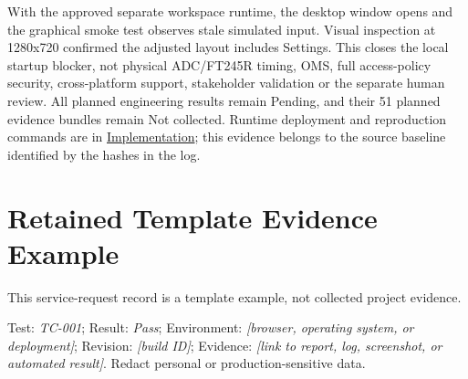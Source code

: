 With the approved separate workspace runtime, the desktop window opens and
the graphical smoke test observes stale simulated input. Visual inspection at
1280x720 confirmed the adjusted layout includes Settings. This closes the
local startup blocker, not physical ADC/FT245R timing, OMS, full access-policy
security, cross-platform support, stakeholder validation or the separate human
review. All planned engineering results remain Pending, and their 51 planned
evidence bundles remain Not collected. Runtime deployment and reproduction
commands are in \hyperref[Section:SimulatorPrototype]{Implementation}; this
evidence belongs to the source baseline identified by the hashes in the log.

\section{Retained Template Evidence Example}
This service-request record is a template example, not collected project evidence.

Test: \textit{TC-001}; Result: \textit{Pass}; Environment: \textit{[browser, operating system, or deployment]}; Revision: \textit{[build ID]}; Evidence: \textit{[link to report, log, screenshot, or automated result]}. Redact personal or production-sensitive data.
